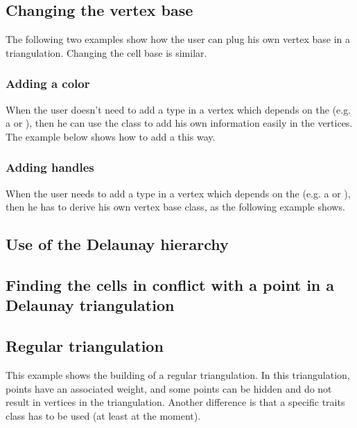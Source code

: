 
\subsection{Changing the vertex base}
The following two examples show how the user can plug his own vertex base in a
triangulation.  Changing the cell base is similar.

\subsubsection{Adding a color}
\label{Triangulation3-sec-examples-color}
When the user doesn't need to add a type in a vertex which depends on the
 (e.g. a  or
), then he can use the
 class to add his own information
easily in the vertices.  The example below shows how to add a 
this way.


\subsubsection{Adding handles}
When the user needs to add a type in a vertex which depends on the
 (e.g. a  or
), then he has to derive his own vertex base class,
as the following example shows.


\subsection{Use of the Delaunay hierarchy}


\subsection{Finding the cells in conflict with a point in a Delaunay
triangulation}


\subsection{Regular triangulation}
This example shows the building of a regular triangulation.  In this
triangulation, points have an associated weight, and some points can
be hidden and do not result in vertices in the triangulation.
Another difference is that a specific traits class has to be used
(at least at the moment).

